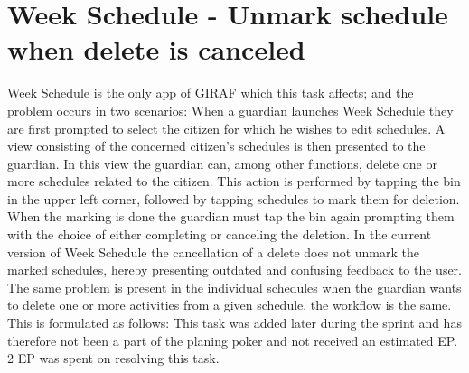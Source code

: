 \section{Week Schedule - Unmark schedule when delete is canceled}
Week Schedule is the only app of GIRAF which this task affects; and the problem occurs in two scenarios:
When a guardian launches Week Schedule they are first prompted to select the citizen for which he wishes to edit schedules.
A view consisting of the concerned citizen's schedules is then presented to the guardian.
In this view the guardian can, among other functions, delete one or more schedules related to the citizen.
This action is performed by tapping the bin in the upper left corner, followed by tapping schedules to mark them for deletion.
When the marking is done the guardian must tap the bin again prompting them with the choice of either completing or canceling the deletion.
In the current version of Week Schedule the cancellation of a delete does not unmark the marked schedules, hereby presenting outdated and confusing feedback to the user.
The same problem is present in the individual schedules when the guardian wants to delete one or more activities from a given schedule, the workflow is the same.
This is formulated as follows: 
This task was added later during the sprint and has therefore not been a part of the planing poker and not received an estimated EP.
2 EP was spent on resolving this task. 

